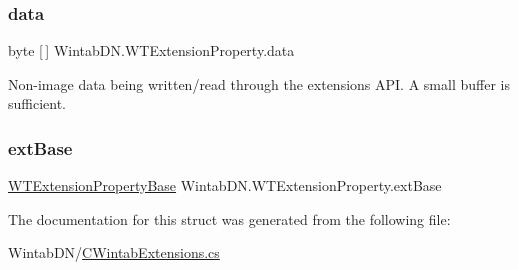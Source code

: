\subsubsection{\texorpdfstring{data}{data}}
{\footnotesize\ttfamily byte \mbox{[}$\,$\mbox{]} Wintab\+D\+N.\+W\+T\+Extension\+Property.\+data}



Non-\/image data being written/read through the extensions A\+PI. A small buffer is sufficient. 

\mbox{\label{struct_wintab_d_n_1_1_w_t_extension_property_a4035705d46258a4fcfb82dd981da7f30}} 
\subsubsection{\texorpdfstring{ext\+Base}{extBase}}
{\footnotesize\ttfamily \mbox{\hyperlink{struct_wintab_d_n_1_1_w_t_extension_property_base}{W\+T\+Extension\+Property\+Base}} Wintab\+D\+N.\+W\+T\+Extension\+Property.\+ext\+Base}



The documentation for this struct was generated from the following file\+:\begin{DoxyCompactItemize}
\item 
Wintab\+D\+N/\mbox{\hyperlink{_c_wintab_extensions_8cs}{C\+Wintab\+Extensions.\+cs}}\end{DoxyCompactItemize}
